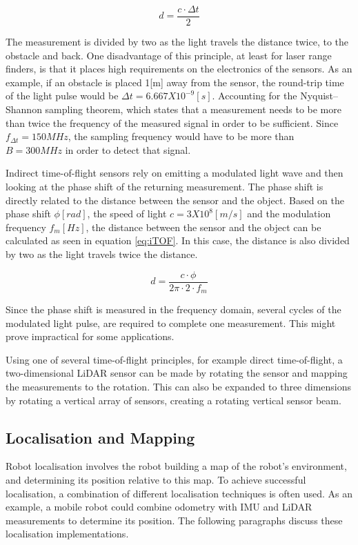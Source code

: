 \begin{equation}\label{eq:TOF}
d = \frac{c \cdot \Delta t}{2}
\end{equation}

The measurement is divided by two as the light travels the distance twice, to the obstacle and back. One disadvantage of this principle, at least for laser range finders, is that it places high requirements on the electronics of the sensors. As an example, if an obstacle is placed 1[m] away from the sensor, the round-trip time of the light pulse would be $\Delta t=6.667X10^{-9}[s]$. Accounting for the Nyquist–Shannon sampling theorem, which states that a measurement needs to be more than twice the frequency of the measured signal in order to be sufficient. Since $f_{\Delta t}=150MHz$, the sampling frequency would have to be more than $B=300MHz$ in order to detect that signal. 

Indirect time-of-flight sensors rely on emitting a modulated light wave and then looking at the phase shift of the returning measurement. The phase shift is directly related to the distance between the sensor and the object. Based on the phase shift $\phi[rad]$, the speed of light $c=3X10^8[m/s]$ and the modulation frequency $f_m[Hz]$, the distance between the sensor and the object can be calculated as seen in equation \ref{eq:iTOF}. In this case, the distance is also divided by two as the light travels twice the distance.

\begin{equation}\label{eq:iTOF}
d = \frac{c \cdot \phi}{2\pi \cdot 2 \cdot f_m}
\end{equation}

Since the phase shift is measured in the frequency domain, several cycles of the modulated light pulse, are required to complete one measurement. This might prove impractical for some applications.

Using one of several time-of-flight principles, for example direct time-of-flight, a two-dimensional LiDAR sensor can be made by rotating the sensor and mapping the measurements to the rotation. This can also be expanded to three dimensions by rotating a vertical array of sensors, creating a rotating vertical sensor beam.



\subsection{Localisation and Mapping}\label{sec:T:AN:Localisation}
Robot localisation involves the robot building a map of the robot's environment, and determining its position relative to this map\cite{SiegwartRoland2011Itam}.  To achieve successful localisation, a combination of different localisation techniques is often used. As an example, a mobile robot could combine odometry with IMU and LiDAR measurements to determine its position. The following paragraphs discuss these localisation implementations.

